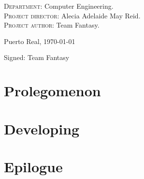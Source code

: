 \documentclass{book}
\begin{document}
{\begin{flushleft}
	\textsc{Department}: \nohyphens{Computer Engineering.} \\
	\textsc{Project director}: \nohyphens{Alecia Adelaide May Reid.} \\
	\textsc{Project author}: \nohyphens{Team Fantasy}. \\
\end{flushleft}

\bigskip
\bigskip
\bigskip

\begin{flushright}
	\large
	Puerto Real, \today
	
	\bigskip    
	\bigskip
	\bigskip
	\bigskip
	\bigskip
	\bigskip
	\bigskip
	\bigskip
	Signed: Team Fantasy
	
\end{flushright}

}

\newpage




	\tableofcontents
	\newpage
	
	\part{Prolegomenon}
	
	
	
	\part{Developing}
	
	
	
	
	
	\part{Epilogue}
	
	
	
	
	
\end{document}

